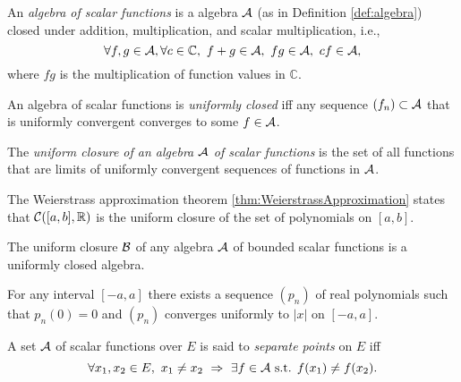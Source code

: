 \begin{defn}
  \label{def:algebraOfFuncs}
  An \emph{algebra of scalar functions} %
  is a algebra ${\cal A}$ (as in Definition \ref{def:algebra})
  closed under addition, multiplication,
  and scalar multiplication, i.e.,
  \begin{equation}
    \label{eq:algebraOfFuncs}
    \forall f,g\in {\cal A}, \forall c\in\mathbb{C},\
    f+g\in{\cal A},\ fg\in {\cal A},\ cf\in{\cal A},
  \end{equation}
  where $fg$ is the multiplication of function values in $\mathbb{C}$.
\end{defn}

\begin{defn}
  \label{def:uniformClosedness}
  An algebra of scalar functions is \emph{uniformly closed}
  iff
  any sequence $(f_n)\subset {\cal A}$
  that is uniformly convergent
  converges to some $f\in {\cal A}$.
\end{defn}


\begin{defn}
  \label{def:uniformClosure}
  The \emph{uniform closure of an algebra ${\cal A}$ of scalar functions}
  is the set of all functions that are limits
  of uniformly convergent sequences of functions in ${\cal A}$.
\end{defn}

\begin{exm}
  The Weierstrass approximation theorem \ref{thm:WeierstrassApproximation}
  states that ${\cal C}([a,b],\mathbb{R})$
  is the uniform closure of the set of polynomials on $[a,b]$.
\end{exm}

\begin{lem}
  \label{lem:uniformClosureIsClosed}
  The uniform closure ${\cal B}$ of any algebra ${\cal A}$
  of bounded scalar functions is a uniformly closed algebra. 
\end{lem}


\begin{lem}
  \label{lem:polyConvergesToAbsX}
  For any interval $[-a,a]$
  there exists a sequence $(p_n)$ of real polynomials
  such that $p_n(0)=0$ and
  $(p_n)$ converges uniformly to $|x|$ on $[-a,a]$. 
\end{lem}

\begin{defn}
  \label{def:separatePoints}
  A set ${\cal A}$ of scalar functions over $E$
  is said to \emph{separate points} on $E$
  iff
  \begin{displaymath}
    \forall x_1,x_2\in E,\
    x_1\ne x_2\ \Rightarrow\
    \exists f\in{\cal A} \text{ s.t. }
    f(x_1)\ne f(x_2).
  \end{displaymath}
\end{defn}


